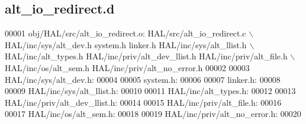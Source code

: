 \subsection{alt\+\_\+io\+\_\+redirect.\+d}
\label{alt__io__redirect_8d_source}

\begin{DoxyCode}
00001 obj/HAL/src/alt_io_redirect.o: HAL/src/alt_io_redirect.c \(\backslash\)
 HAL/inc/sys/alt_dev.h system.h linker.h HAL/inc/sys/alt_llist.h \(\backslash\)
 HAL/inc/alt\_types.h HAL/inc/priv/alt_dev_llist.h HAL/inc/priv/alt\_file.h \(\backslash\)
 HAL/inc/os/alt\_sem.h HAL/inc/priv/alt_no_error.h
00002 
00003 HAL/inc/sys/alt_dev.h:
00004 
00005 system.h:
00006 
00007 linker.h:
00008 
00009 HAL/inc/sys/alt_llist.h:
00010 
00011 HAL/inc/alt\_types.h:
00012 
00013 HAL/inc/priv/alt_dev_llist.h:
00014 
00015 HAL/inc/priv/alt\_file.h:
00016 
00017 HAL/inc/os/alt\_sem.h:
00018 
00019 HAL/inc/priv/alt_no_error.h:
00020 \end{DoxyCode}
